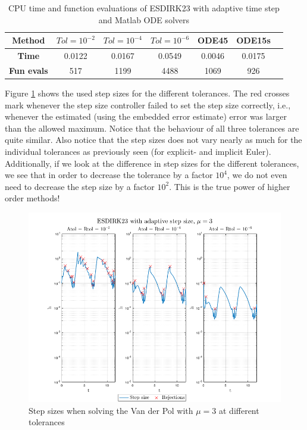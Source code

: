 \begin{table}[H]
    \centering
    \caption{CPU time and function evaluations of ESDIRK23 with adaptive time step and Matlab ODE solvers}
    \begin{tabular}{|c||c|c|c|c|c|c|} \hline
         \textbf{Method}    & $Tol = 10^{-2}$&   $Tol = 10^{-4}$ & $Tol = 10^{-6}$ & ODE45 & ODE15s     \\ \hline \hline 
         \textbf{Time}      & 0.0122 &   0.0167  &  0.0549 & 0.0046 & 0.0175   \\ \hline
         \textbf{Fun evals} & 517    &   1199  &    4488 & 1069 & 926  \\ \hline
    \end{tabular}
    \label{tab7:mu3}
\end{table}

Figure \ref{fig7:mu3_h} shows the used step sizes for the different tolerances. The red crosses mark whenever the step size controller failed to set the step size correctly, i.e., whenever the estimated (using the embedded error estimate) error was larger than the allowed maximum. Notice that the behaviour of all three tolerances are quite similar. Also notice that the step sizes does not vary nearly as much for the individual tolerances as previously seen (for explicit- and implicit Euler). Additionally, if we look at the difference in step sizes for the different tolerances, we see that in order to decrease the tolerance by a factor $10^4$, we do not even need to decrease the step size by a factor $10^2$. This is the true power of higher order methods! 

\begin{figure}[H]
    \centering
    \includegraphics[width=\textwidth]{graphics/opg7/mu3_h.png}
    \caption{Step sizes when solving the Van der Pol with $\mu = 3$ at different tolerances}
    \label{fig7:mu3_h}
\end{figure}

